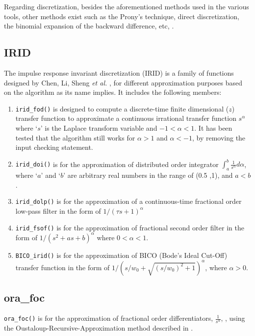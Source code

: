 \documentclass[11pt]{tCON2e}
\theoremstyle{plain}\newtheorem{theorem}{Theorem}
\theoremstyle{definition}
\theoremstyle{remark}
\begin{document}
Regarding discretization, besides the aforementioned methods used in the various tools, other methods exist such as the Prony's technique, direct discretization, the binomial expansion of the backward difference, etc, \cite{ref:book_FO_Riccardo}.




\subsection{IRID}
The impulse response invariant discretization (IRID) is a family of functions designed by Chen, Li, Sheng \emph{et al.} \cite{ref:Liyan_irid, ref:Chen_irid_fod}, for different approximation purposes based on the algorithm as its name implies. It includes the following members:
\begin{enumerate}
    \item {\tt irid\_fod()} is designed to compute a discrete-time finite dimensional ($z$) transfer function to approximate a continuous irrational transfer
        function $s^\alpha$ where `$s$' is the Laplace transform variable and $-1<\alpha<1$. It has been tested that the algorithm still works for $\alpha>1$ and $\alpha<-1$, by removing the input checking statement.
    \item {\tt irid\_doi()} is for the approximation of distributed order integrator $\int _a^b \frac{1}{s^{\alpha}} d \alpha $, where `$a$' and `$b$' are arbitrary real numbers in the range of (0.5 ,1), and $a<b$.
    \item {\tt irid\_dolp()} is for the approximation of a continuous-time fractional order low-pass filter in the form of $1/(\tau s +1)^{\alpha}$
    \item {\tt irid\_fsof()} is for the approximation of fractional second order filter in the form of $ 1/(s^2 + a s + b)^{\alpha}$ where $0<\alpha<1$.
    \item {\tt BICO\_irid()} is for the approximation of BICO (Bode's Ideal Cut-Off) transfer function in the form of $  1/(s/w_0+ \sqrt{(s/w_0)^2+1})^\alpha $, where $\alpha>0$.
\end{enumerate}




\subsection{ora\_foc}
{\tt ora\_foc()} is for the approximation of fractional order differentiators, $\frac{1}{s^\alpha}$, \cite{ref:Book_Xue_Chen_linear_feedback}, using the Oustaloup-Recursive-Approximation method described in \cite{ref:Oustaloup_ora}.
\end{document}
